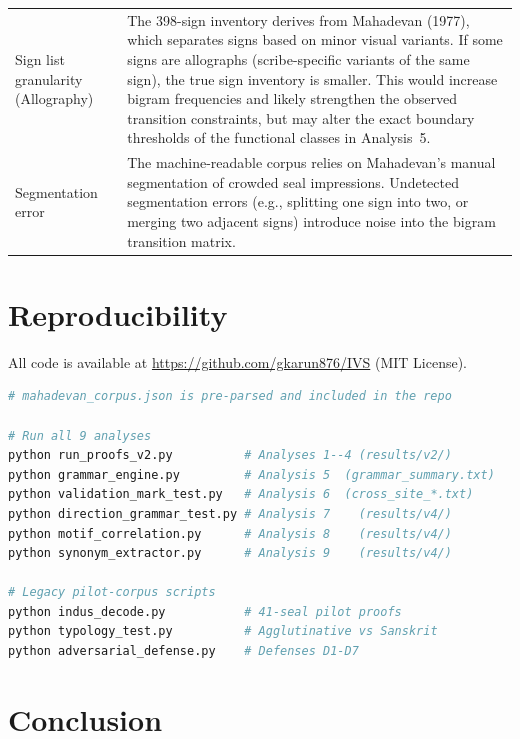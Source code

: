 \documentclass[12pt,letterpaper]{article}
\begin{document}
\begin{table}[htbp]
\begin{tabularx}{\textwidth}{p{4.5cm}X}
\addlinespace
Sign list granularity (Allography) &
The 398-sign inventory derives from Mahadevan (1977), which separates signs based
on minor visual variants. If some signs are allographs (scribe-specific variants
of the same sign), the true sign inventory is smaller. This would increase bigram
frequencies and likely strengthen the observed transition constraints, but may
alter the exact boundary thresholds of the functional classes in Analysis~5. \\
\addlinespace
Segmentation error &
The machine-readable corpus relies on Mahadevan's manual segmentation of crowded
seal impressions. Undetected segmentation errors (e.g., splitting one sign into
two, or merging two adjacent signs) introduce noise into the bigram transition
matrix. \\
\bottomrule
\end{tabularx}
\end{table}

\section{Reproducibility}
\label{sec:repro}

All code is available at \url{https://github.com/gkarun876/IVS} (MIT License).

\begin{lstlisting}[language=bash, basicstyle=\small\ttfamily, frame=single,
                   caption={Quick start}, breaklines=false]
# mahadevan_corpus.json is pre-parsed and included in the repo

# Run all 9 analyses
python run_proofs_v2.py          # Analyses 1--4 (results/v2/)
python grammar_engine.py         # Analysis 5  (grammar_summary.txt)
python validation_mark_test.py   # Analysis 6  (cross_site_*.txt)
python direction_grammar_test.py # Analysis 7    (results/v4/)
python motif_correlation.py      # Analysis 8    (results/v4/)
python synonym_extractor.py      # Analysis 9    (results/v4/)

# Legacy pilot-corpus scripts
python indus_decode.py           # 41-seal pilot proofs
python typology_test.py          # Agglutinative vs Sanskrit
python adversarial_defense.py    # Defenses D1-D7
\end{lstlisting}

\section{Conclusion}
\label{sec:conclusion}
\end{document}
